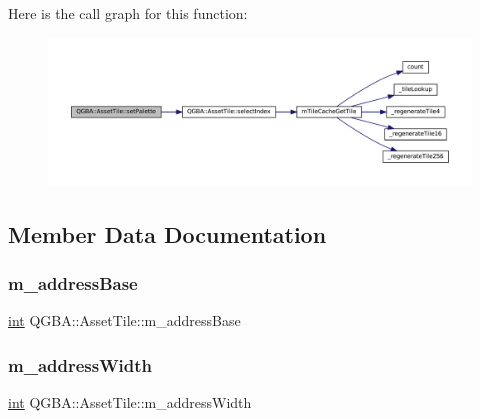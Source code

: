 Here is the call graph for this function\+:
\nopagebreak
\begin{figure}[H]
\begin{center}
\leavevmode
\includegraphics[width=350pt]{class_q_g_b_a_1_1_asset_tile_ae6edb2008ce1ff20223ae29193765a72_cgraph}
\end{center}
\end{figure}


\subsection{Member Data Documentation}
\mbox{\label{class_q_g_b_a_1_1_asset_tile_a51f3d80a13136b42e990e079e4990b3b}} 
\subsubsection{\texorpdfstring{m\+\_\+address\+Base}{m\_addressBase}}
{\footnotesize\ttfamily \mbox{\hyperlink{ioapi_8h_a787fa3cf048117ba7123753c1e74fcd6}{int}} Q\+G\+B\+A\+::\+Asset\+Tile\+::m\+\_\+address\+Base\hspace{0.3cm}{\ttfamily [private]}}

\mbox{\label{class_q_g_b_a_1_1_asset_tile_a6752f5e2109f413f2918e59511b3a053}} 
\subsubsection{\texorpdfstring{m\+\_\+address\+Width}{m\_addressWidth}}
{\footnotesize\ttfamily \mbox{\hyperlink{ioapi_8h_a787fa3cf048117ba7123753c1e74fcd6}{int}} Q\+G\+B\+A\+::\+Asset\+Tile\+::m\+\_\+address\+Width\hspace{0.3cm}{\ttfamily [private]}}

